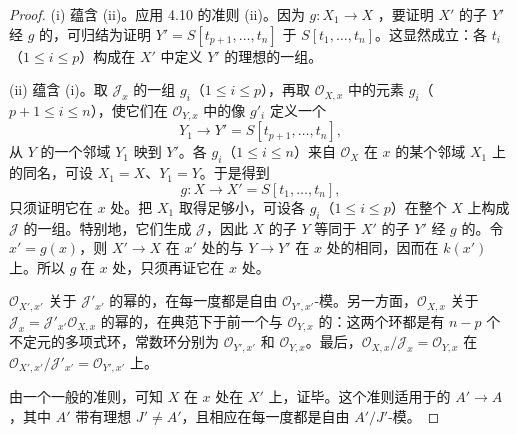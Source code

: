 \begin{proof}
(i) 蕴含 (ii)。应用 4.10 的准则 (ii)。因为 $g:X_1\to X$ ，要证明 $X'$ 的子 $Y'$ 经 $g$ 的，可归结为证明 $Y'=S[t_{p+1},\ldots,t_n]$ 于 $S[t_1,\ldots,t_n]$。这显然成立：各 $t_i$（$1\leq i\leq p$）构成在 $X'$ 中定义 $Y'$ 的理想的一组。

(ii) 蕴含 (i)。取 $\mathcal J_x$ 的一组 $g_i$（$1\leq i\leq p$），再取 $\mathcal O_{X,x}$ 中的元素 $g_i$（$p+1\leq i\leq n$），使它们在 $\mathcal O_{Y,x}$ 中的像 $g'_i$ 定义一个
\[
Y_1\longrightarrow Y'=S[t_{p+1},\ldots,t_n],
\]
从 $Y$ 的一个邻域 $Y_1$ 映到 $Y'$。各 $g_i$（$1\leq i\leq n$）来自 $\mathcal O_X$ 在 $x$ 的某个邻域 $X_1$ 上的同名，可设 $X_1=X$、$Y_1=Y$。于是得到
\[
g:X\longrightarrow X'=S[t_1,\ldots,t_n],
\]
只须证明它在 $x$ 处。把 $X_1$ 取得足够小，可设各 $g_i$（$1\leq i\leq p$）在整个 $X$ 上构成 $\mathcal J$ 的一组。特别地，它们生成 $\mathcal J$，因此 $X$ 的子 $Y$ 等同于 $X'$ 的子 $Y'$ 经 $g$ 的。令 $x'=g(x)$，则 $X'\to X$ 在 $x'$ 处的与 $Y\to Y'$ 在 $x$ 处的相同，因而在 $k(x')$ 上。所以 $g$ 在 $x$ 处，只须再证它在 $x$ 处。

$\mathcal O_{X',x'}$ 关于 $\mathcal J'_{x'}$ 的幂的，在每一度都是自由 $\mathcal O_{Y',x'}$-模。另一方面，$\mathcal O_{X,x}$ 关于 $\mathcal J_x=\mathcal J'_{x'}\mathcal O_{X,x}$ 的幂的，在典范下于前一个与 $\mathcal O_{Y,x}$ 的：这两个环都是有 $n-p$ 个不定元的多项式环，常数环分别为 $\mathcal O_{Y',x'}$ 和 $\mathcal O_{Y,x}$。最后，$\mathcal O_{X,x}/\mathcal J_x=\mathcal O_{Y,x}$ 在 $\mathcal O_{X',x'}/\mathcal J'_{x'}=\mathcal O_{Y',x'}$ 上。

由一个一般的准则，可知 $X$ 在 $x$ 处在 $X'$ 上，证毕。这个准则适用于的 $A'\to A$，其中 $A'$ 带有理想 $J'\ne A'$，且相应在每一度都是自由 $A'/J'$-模。
\end{proof}

